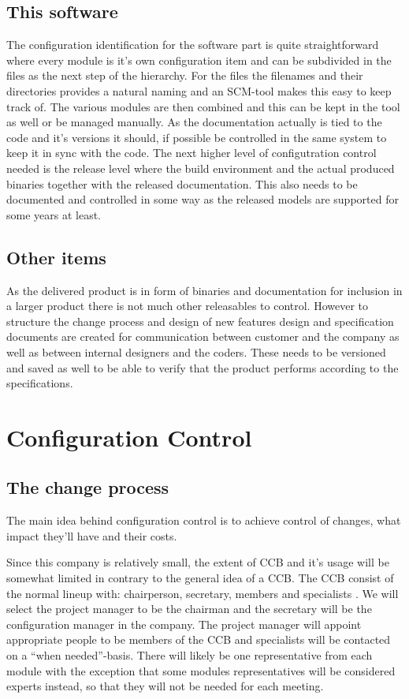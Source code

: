 \documentclass[a4paper,11pt]{article}
\begin{document}
\subsection{This software}

The configuration identification for the software part is quite straightforward where every module is it's own configuration item and can be subdivided in the files as the next step of the hierarchy.
For the files the filenames and their directories provides a natural naming and an SCM-tool makes this easy to keep track of. The various modules are then combined and this can be kept in the tool as well or be managed manually.
As the documentation actually is tied to the code and it's versions it should, if possible be controlled in the same system to keep it in sync with the code.
The next higher level of configutration control needed is the release level where the build environment and the actual produced binaries together with the released documentation.
This also needs to be documented and controlled in some way as the released models are supported for some years at least.


\subsection{Other items}

As the delivered product is in form of binaries and documentation for inclusion in a larger product there is not much other releasables to control.
However to structure the change process and design of new features design and specification documents are created for communication between customer and the company as well as between internal designers and the coders. These needs to be versioned and saved as well to be able to verify that the product performs according to the specifications.

\section{Configuration Control}

\subsection{The change process}
The main idea behind configuration control is to achieve control of changes, what impact they'll have and their costs.

Since this company is relatively small, the extent of CCB and it's usage will be somewhat limited in contrary to the general idea of a CCB.
The CCB consist of the normal lineup with: chairperson, secretary, members and specialists \cite{daniels}. We will select the project manager
to be the chairman and the secretary will be the configuration manager in the company. The project manager will appoint appropriate people to be
members of the CCB and specialists will be contacted on a ``when needed''-basis. There will likely be one representative from each module with the exception
that some modules representatives will be considered experts instead, so that they will not be needed for each meeting.
\end{document}
